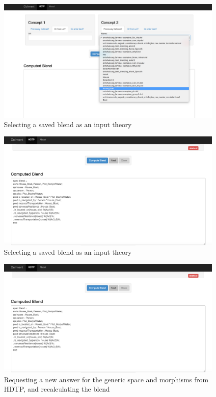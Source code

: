 \begin{figure}[!h]
\begin{center}
\includegraphics[width=\textwidth]{ss6.png}
\end{center}
\label{fig:ss6}
\caption{Selecting a saved blend as an input theory}
\end{figure}

\begin{figure}[!h]
\begin{center}
\includegraphics[width=\textwidth]{ss7.png}
\end{center}
\label{fig:ss6}
\caption{Selecting a saved blend as an input theory}
\end{figure}

\begin{figure}[!h]
\begin{center}
\includegraphics[width=\textwidth]{ss7.png}
\end{center}
\label{fig:ss6}
\caption{Requesting a new answer for the generic space and morphisms from HDTP, and recalculating the blend}
\end{figure}

